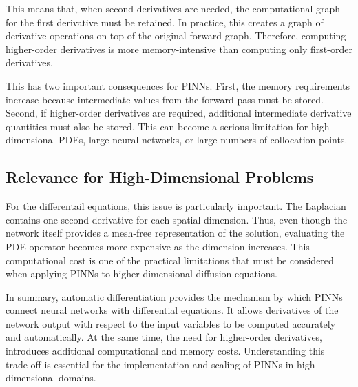 This means that, when second derivatives are needed, the computational graph for the first derivative must be retained. In practice, this creates a graph of derivative operations on top of the original forward graph. Therefore, computing higher-order derivatives is more memory-intensive than computing only first-order derivatives.

This has two important consequences for PINNs. First, the memory requirements increase because intermediate values from the forward pass must be stored. Second, if higher-order derivatives are required, additional intermediate derivative quantities must also be stored. This can become a serious limitation for high-dimensional PDEs, large neural networks, or large numbers of collocation points.


\subsection{Relevance for High-Dimensional Problems}

For the differentail equations, this issue is particularly important.
The Laplacian contains one second derivative for each spatial dimension.
Thus, even though the network itself provides a mesh-free representation of the solution,
evaluating the PDE operator becomes more expensive as the dimension increases.
This computational cost is one of the practical limitations that must be considered when applying PINNs to higher-dimensional diffusion equations.

In summary, automatic differentiation provides the mechanism by which PINNs connect neural networks with differential equations.
It allows derivatives of the network output with respect to the input variables to be computed accurately and automatically.
At the same time, the need for higher-order derivatives, introduces additional computational and memory costs.
Understanding this trade-off is essential for the implementation and scaling of PINNs in high-dimensional domains.

